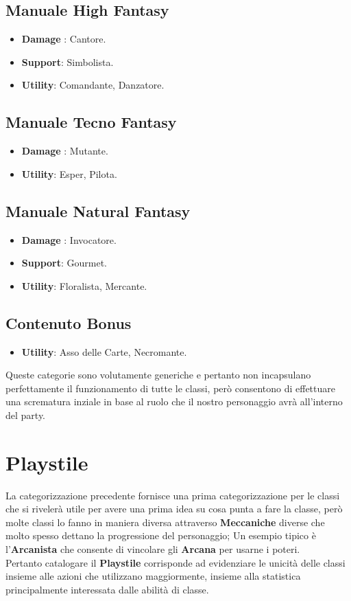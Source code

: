\documentclass{article}
\begin{document}
\subsection{Manuale High Fantasy}

\begin{itemize}
    \item \textbf{Damage} : Cantore.
    \item \textbf{Support}: Simbolista.
    \item \textbf{Utility}: Comandante, Danzatore.
\end{itemize}

\subsection{Manuale Tecno Fantasy}

\begin{itemize}
    \item \textbf{Damage} : Mutante.
    \item \textbf{Utility}: Esper, Pilota.
\end{itemize}

\subsection{Manuale Natural Fantasy}

\begin{itemize}
    \item \textbf{Damage} : Invocatore.
    \item \textbf{Support}: Gourmet.
    \item \textbf{Utility}: Floralista, Mercante.
\end{itemize}


\subsection{Contenuto Bonus}

\begin{itemize}
    \item \textbf{Utility}: Asso delle Carte, Necromante.
\end{itemize}
Queste categorie sono volutamente generiche e pertanto non incapsulano perfettamente il funzionamento di 
tutte le classi, però consentono di effettuare una scrematura inziale in base al ruolo che il nostro personaggio 
avrà all'interno del party.
\section{Playstile}
La categorizzazione precedente fornisce una prima categorizzazione per le classi che si rivelerà utile per avere
una prima idea su cosa punta a fare la classe, però molte classi lo fanno in maniera diversa attraverso \textbf{Meccaniche}
diverse che molto spesso dettano la progressione del personaggio; Un esempio tipico è l'\textbf{Arcanista} che consente 
di vincolare gli \textbf{Arcana} per usarne i poteri.
\\
Pertanto catalogare il \textbf{Playstile} corrisponde ad evidenziare le unicità delle classi insieme alle azioni che utilizzano
maggiormente, insieme alla statistica principalmente interessata dalle abilità di classe.
\end{document}
